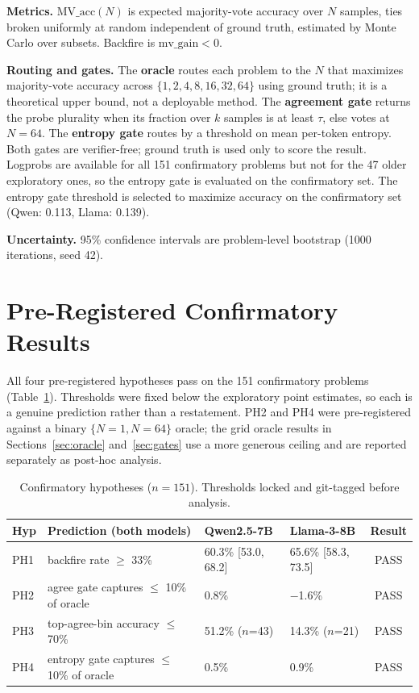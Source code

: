 \documentclass{article}
\begin{document}
\textbf{Metrics.} $\text{MV\_acc}(N)$ is expected majority-vote accuracy over
$N$ samples, ties broken uniformly at random independent of ground truth,
estimated by Monte Carlo over subsets. Backfire is $\text{mv\_gain} < 0$.

\textbf{Routing and gates.} The \textbf{oracle} routes each problem to the
$N$ that maximizes majority-vote accuracy across $\{1,2,4,8,16,32,64\}$ using
ground truth; it is a theoretical upper bound, not a deployable method. The
\textbf{agreement gate} returns the probe plurality when its fraction over $k$
samples is at least $\tau$, else votes at $N=64$. The \textbf{entropy gate}
routes by a threshold on mean per-token entropy. Both gates are verifier-free;
ground truth is used only to score the result. Logprobs are available for all
151 confirmatory problems but not for the 47 older exploratory ones, so the
entropy gate is evaluated on the confirmatory set. The entropy gate threshold
is selected to maximize accuracy on the confirmatory set (Qwen: 0.113, Llama:
0.139).

\textbf{Uncertainty.} 95\% confidence intervals are problem-level bootstrap
(1000 iterations, seed 42).

\section{Pre-Registered Confirmatory Results}

All four pre-registered hypotheses pass on the 151 confirmatory problems
(Table~\ref{tab:confirmatory}). Thresholds were fixed below the exploratory
point estimates, so each is a genuine prediction rather than a restatement.
PH2 and PH4 were pre-registered against a binary $\{N=1, N=64\}$ oracle; the
grid oracle results in Sections~\ref{sec:oracle} and~\ref{sec:gates} use a
more generous ceiling and are reported separately as post-hoc analysis.

\begin{table}[t]
\begin{center}
\begin{tabular}{llllc}
\toprule
\textbf{Hyp} & \textbf{Prediction (both models)} & \textbf{Qwen2.5-7B} & \textbf{Llama-3-8B} & \textbf{Result} \\
\midrule
PH1 & backfire rate $\geq$ 33\%          & 60.3\% [53.0, 68.2] & 65.6\% [58.3, 73.5] & PASS \\
PH2 & agree gate captures $\leq$ 10\% of oracle & 0.8\%        & $-$1.6\%            & PASS \\
PH3 & top-agree-bin accuracy $\leq$ 70\% & 51.2\% ($n$=43)     & 14.3\% ($n$=21)     & PASS \\
PH4 & entropy gate captures $\leq$ 10\% of oracle & 0.5\%      & 0.9\%               & PASS \\
\bottomrule
\end{tabular}
\end{center}
\caption{Confirmatory hypotheses ($n=151$). Thresholds locked and git-tagged before analysis.}
\label{tab:confirmatory}
\end{table}
\end{document}
